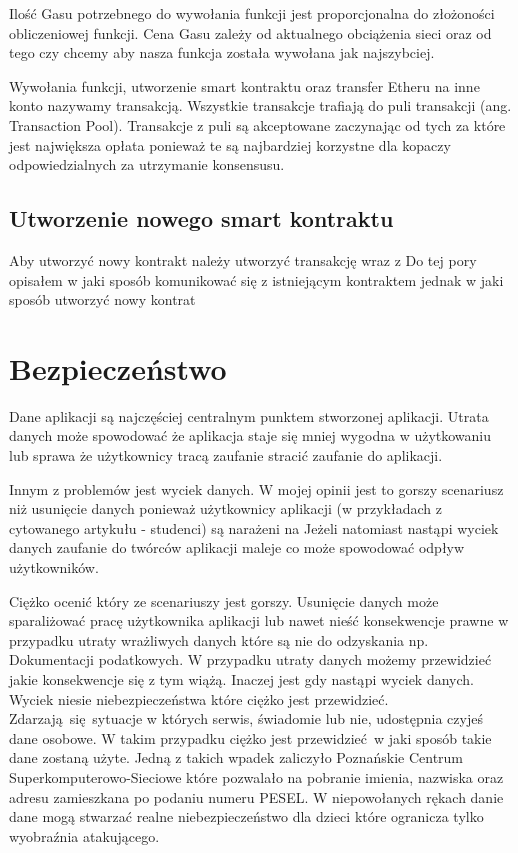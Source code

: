 \documentclass[]{llncs}
\begin{document}
  Ilość Gasu potrzebnego do wywołania funkcji jest proporcjonalna do złożoności
  obliczeniowej funkcji. Cena Gasu zależy od aktualnego obciążenia sieci oraz od
  tego czy chcemy aby nasza funkcja została wywołana jak najszybciej.

  Wywołania funkcji, utworzenie smart kontraktu oraz transfer Etheru na inne
  konto nazywamy transakcją. Wszystkie transakcje trafiają do puli transakcji
  (ang.  Transaction Pool). Transakcje z puli są akceptowane zaczynając od tych
  za które jest największa opłata ponieważ te są najbardziej korzystne dla
  kopaczy odpowiedzialnych za utrzymanie konsensusu.

\subsection{Utworzenie nowego smart kontraktu}

  Aby utworzyć nowy kontrakt należy utworzyć transakcję wraz z 
  Do tej pory opisałem w jaki sposób komunikować się z istniejącym kontraktem
  jednak w jaki sposób utworzyć nowy kontrat

\section{Bezpieczeństwo}

  Dane aplikacji są najczęściej centralnym punktem stworzonej aplikacji. Utrata
  danych może spowodować że aplikacja staje się mniej wygodna w
  użytkowaniu\cite{teatr-wspolczesny-utrata-danych} lub sprawa że użytkownicy
  tracą zaufanie stracić zaufanie do aplikacji\cite{nazwa-pl-utrata-danych}.

  Innym z problemów jest wyciek danych\cite{wyciek-danych-studentow}. W mojej
  opinii jest to gorszy scenariusz niż usunięcie danych ponieważ użytkownicy
  aplikacji (w przykładach z cytowanego artykułu - studenci) są narażeni na
  Jeżeli natomiast nastąpi wyciek danych zaufanie do twórców aplikacji maleje co
  może spowodować odpływ użytkowników.

  Ciężko ocenić który ze scenariuszy jest gorszy. Usunięcie danych może
  sparaliżować pracę użytkownika aplikacji lub nawet nieść konsekwencje prawne w
  przypadku utraty wrażliwych danych które są nie do odzyskania np. Dokumentacji
  podatkowych\cite{utrata-dokumentacji}. W przypadku utraty danych możemy
  przewidzieć jakie konsekwencje się z tym wiążą. Inaczej jest gdy nastąpi
  wyciek danych. Wyciek niesie niebezpieczeństwa które ciężko jest przewidzieć.
  Zdarzają się sytuacje w których serwis, świadomie lub nie, udostępnia czyjeś
  dane osobowe. W takim przypadku ciężko jest przewidzieć w jaki sposób takie
  dane zostaną użyte. Jedną z takich wpadek zaliczyło Poznańskie Centrum
  Superkomputerowo-Sieciowe które pozwalało na pobranie imienia, nazwiska oraz
  adresu zamieszkana po podaniu numeru PESEL\cite{dane-dzieci}. W niepowołanych
  rękach danie dane mogą stwarzać realne niebezpieczeństwo dla dzieci które
  ogranicza tylko wyobraźnia atakującego.
\end{document}
